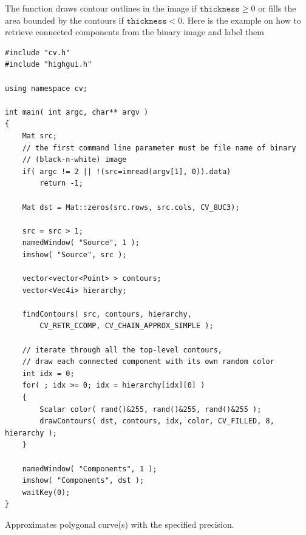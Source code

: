 The function draws contour outlines in the image if $\texttt{thickness} \ge 0$ or fills the area bounded by the contours if $ \texttt{thickness}<0$. Here is the example on how to retrieve connected components from the binary image and label them

\begin{lstlisting}
#include "cv.h"
#include "highgui.h"

using namespace cv;

int main( int argc, char** argv )
{
    Mat src;
    // the first command line parameter must be file name of binary 
    // (black-n-white) image
    if( argc != 2 || !(src=imread(argv[1], 0)).data)
        return -1;

    Mat dst = Mat::zeros(src.rows, src.cols, CV_8UC3);

    src = src > 1;
    namedWindow( "Source", 1 );
    imshow( "Source", src );

    vector<vector<Point> > contours;
    vector<Vec4i> hierarchy;
    
    findContours( src, contours, hierarchy, 
        CV_RETR_CCOMP, CV_CHAIN_APPROX_SIMPLE );

    // iterate through all the top-level contours,
    // draw each connected component with its own random color
    int idx = 0;
    for( ; idx >= 0; idx = hierarchy[idx][0] )
    {
        Scalar color( rand()&255, rand()&255, rand()&255 );
        drawContours( dst, contours, idx, color, CV_FILLED, 8, hierarchy );
    }

    namedWindow( "Components", 1 );
    imshow( "Components", dst );
    waitKey(0);
}
\end{lstlisting}


Approximates polygonal curve(s) with the specified precision.

\begin{description}
\end{description}


